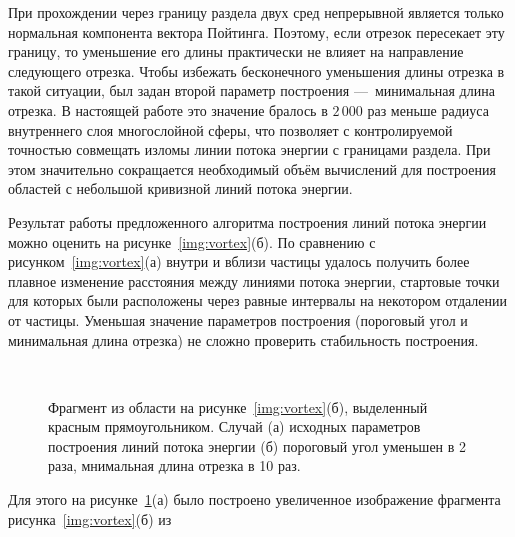 При прохождении через границу раздела двух сред непрерывной является
только нормальная компонента вектора Пойтинга. Поэтому, если отрезок
пересекает эту границу, то уменьшение его длины практически не влияет
на направление следующего отрезка. Чтобы избежать бесконечного
уменьшения длины отрезка в такой ситуации, был задан второй параметр
построения ---~минимальная длина отрезка.  В настоящей работе это
значение бралось в $2\,000$ раз меньше радиуса внутреннего слоя
многослойной сферы, что позволяет с контролируемой точностью
совмещать изломы линии потока энергии с границами раздела. При этом
значительно сокращается необходимый объём вычислений для построения
областей с небольшой кривизной линий потока энергии.

Результат работы предложенного алгоритма построения линий потока
энергии можно оценить на рисунке~\ref{img:vortex}(б).  По сравнению с
рисунком~\ref{img:vortex}(а) внутри и вблизи частицы удалось получить
более плавное изменение расстояния между линиями потока энергии,
стартовые точки для которых были расположены через равные интервалы на
некотором отдалении от частицы.  Уменьшая значение параметров
построения (пороговый угол и минимальная длина отрезка) не сложно
проверить стабильность построения.
\begin{figure}[t] 
{\center
  \begin{minipage}[ht]{0.49\linewidth}        
  \end{minipage}
  \begin{minipage}[ht]{0.49\linewidth}
  \end{minipage}
}\\
{\center
  \begin{minipage}[ht]{0.49\linewidth}        
  \end{minipage}
  \begin{minipage}[ht]{0.49\linewidth}
  \end{minipage}
}
  \caption{Фрагмент из области на рисунке~\ref{img:vortex}(б),
    выделенный красным прямоугольником. Случай (а) исходных параметров построения
    линий потока энергии (б) пороговый угол уменьшен в 2 раза,
    мнимальная длина отрезка в 10 раз.\label{img:vortex-crop}}
\end{figure}
Для этого на рисунке~\ref{img:vortex-crop}(а) было построено
увеличенное изображение фрагмента рисунка~\ref{img:vortex}(б) из
